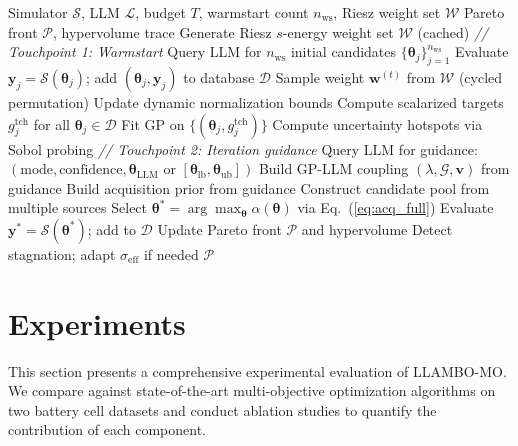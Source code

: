 \documentclass[lettersize,journal]{IEEEtran}
\begin{document}
\begin{algorithm}[!t]
\caption{LLAMBO-MO}
\label{alg:llambo}
\begin{algorithmic}[1]
\raggedright
\REQUIRE Simulator $\mathcal{S}$, LLM $\mathcal{L}$, budget $T$, warmstart count $n_{\text{ws}}$, Riesz weight set $\mathcal{W}$
\ENSURE Pareto front $\mathcal{P}$, hypervolume trace
\STATE Generate Riesz $s$-energy weight set $\mathcal{W}$ (cached)
\STATE \textit{// Touchpoint 1: Warmstart}
\STATE Query LLM for $n_{\text{ws}}$ initial candidates $\{\boldsymbol{\theta}_j\}_{j=1}^{n_{\text{ws}}}$
\STATE Evaluate $\boldsymbol{y}_j = \mathcal{S}(\boldsymbol{\theta}_j)$; add $(\boldsymbol{\theta}_j, \boldsymbol{y}_j)$ to database $\mathcal{D}$
\ENDFOR
{}
\STATE Sample weight $\boldsymbol{w}^{(t)}$ from $\mathcal{W}$ (cycled permutation)
\STATE Update dynamic normalization bounds
\STATE Compute scalarized targets $g_j^{\text{tch}}$ for all $\boldsymbol{\theta}_j \in \mathcal{D}$
\STATE Fit GP on $\{(\boldsymbol{\theta}_j, g_j^{\text{tch}})\}$
\STATE Compute uncertainty hotspots via Sobol probing
\STATE \textit{// Touchpoint 2: Iteration guidance}
\STATE Query LLM for guidance: $(\text{mode}, \text{confidence}, \boldsymbol{\theta}_{\text{LLM}} \text{ or } [\boldsymbol{\theta}_{\text{lb}}, \boldsymbol{\theta}_{\text{ub}}])$
\STATE Build GP-LLM coupling $(\lambda, \mathcal{G}, \boldsymbol{v})$ from guidance
\STATE Build acquisition prior from guidance
\STATE Construct candidate pool from multiple sources
\STATE Select $\boldsymbol{\theta}^* = \arg\max_{\boldsymbol{\theta}} \alpha(\boldsymbol{\theta})$ via Eq.~(\ref{eq:acq_full})
\STATE Evaluate $\boldsymbol{y}^* = \mathcal{S}(\boldsymbol{\theta}^*)$; add to $\mathcal{D}$
\STATE Update Pareto front $\mathcal{P}$ and hypervolume
\STATE Detect stagnation; adapt $\sigma_{\text{eff}}$ if needed
\ENDFOR
\RETURN $\mathcal{P}$
\end{algorithmic}
\end{algorithm}

\section{Experiments}

This section presents a comprehensive experimental evaluation of LLAMBO-MO. We compare against state-of-the-art multi-objective optimization algorithms on two battery cell datasets and conduct ablation studies to quantify the contribution of each component.
\end{document}
